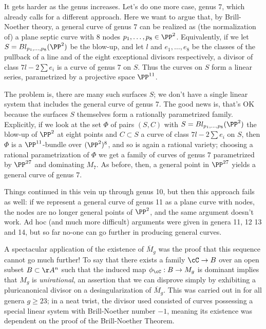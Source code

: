 It gets harder as the genus increases. Let's do one more case, genus 7, which already calls for a different approach. Here we want to argue that, by Brill-Noether theory, a general curve of genus $7$ can be realized as (the normalization of) a plane septic curve with 8 nodes $p_1,\dots,p_8 \in \PP^2$. Equivalently, if we let $S = Bl_{p_1,\dots,p_8}(\PP^2)$ be the blow-up, and let $l$ and $e_1,\dots,e_8$ be the classes of the pullback of a line and of the eight exceptional divisors respectively, a divisor of class $7l - 2 \sum e_i$ is a curve of genus 7 on $S$. Thus the curves on $S$ form a linear series, parametrized by a projective space $\PP^{11}$.

The problem is, there are many such surfaces $S$; we don't have a single linear system that includes the general curve of genus 7. The good news is, that's OK because the surfaces $S$ themselves form a rationally parametrized family. Explicitly, if we look at the set $\Phi$ of pairs $(S, C)$ with $S = Bl_{p_1,\dots,p_8}(\PP^2)$  the blow-up of $\PP^2$ at eight points and $C \subset S$ a curve of class $7l - 2 \sum e_i$ on $S$, then $\Phi$ is a $\PP^{11}$-bundle over $(\PP^2)^8$, and so is again a rational variety; choosing a rational parametrization of $\Phi$ we get a family of curves of genus $7$ parametrized by $\PP^{27}$ and dominating $M_7$. As before, then, a general point in $\PP^{27}$ yields a general curve of genus 7.

Things continued in this vein up through genus 10, but then this approach fails as well: if we represent a general curve of genus 11 as a plane curve with nodes, the nodes are no longer general points of $\PP^2$, and the same argument doesn't work. Ad hoc (and much more difficult) arguments were given in genera 11, 12 13 and 14, but so far no-one can go further in producing general curves. 

A spectacular application of the existence of $\overline M_g$ was the proof that this sequence cannot go much further! To say that there exists a family $\cC \to B$ over an open subset $B \subset \AA^n$ such that the induced map $\phi_\cC : B \to M_g$ is dominant implies that $M_g$ is \emph{unirational}, an assertion that we can disprove simply by exhibiting a pluricanonical divisor on a desingularization of $\overline M_g$. This was carried out in  for all genera $g \geq 23$; in a neat twist, the divisor used consisted of curves possessing a special linear system with Brill-Noether number $-1$, meaning its existence was dependent on the proof of the Brill-Noether Theorem.


